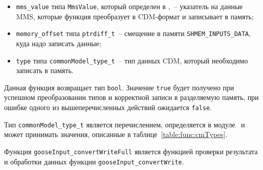 \begin{itemize}
    \item \lstinline{mms_value} типа \lstinline{MmsValue}, который определен в \libIec,~-- указатель на данные MMS, которые функция преобразует в CDM-формат и записывает в память;
    \item \lstinline{memory_offset} типа \lstinline{ptrdiff_t}~-- смещение в памяти \lstinline{SHMEM_INPUTS_DATA}, куда надо записать данные;
    \item \lstinline{type} типа \lstinline{commonModel_type_t}~-- тип данных CDM, который необходимо записать в память.
\end{itemize}

Данная функция возвращает тип \lstinline{bool}. Значение \lstinline{true} будет получено при успешном преобразовании типов и корректной записи в разделяемую память, при
ошибке одного из вышеперечисленных действий ожидается \lstinline{false}.

Тип \lstinline{commonModel_type_t} является перечислением, определяется в модуле \moduleDataStoring\ и может принимать значения, описанные в таблице~\ref{table:func:cmTypes}.

Функция \lstinline{gooseInput_convertWriteFull} является функцией проверки результата и обработки данных функции \lstinline{gooseInput_convertWrite}.

